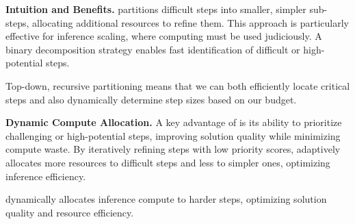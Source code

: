 \textbf{Intuition and Benefits.} \decomp partitions difficult steps into smaller, simpler sub-steps, allocating additional resources to refine them. This approach is particularly effective for inference scaling, where computing must be used judiciously. A binary decomposition strategy enables fast identification of difficult or high-potential steps.

\vspace{-0.2cm}
\begin{tcolorbox}[title=Key Insight: Recursive partitioning, colframe=low,boxsep=0.5mm]
\footnotesize{
    Top-down, recursive partitioning means that we can both efficiently locate critical steps and also dynamically determine step sizes based on our budget.}
\end{tcolorbox}
\vspace{-0.2cm}
\textbf{Dynamic Compute Allocation.}  
A key advantage of \decomp is its ability to prioritize challenging or high-potential steps, improving solution quality while minimizing compute waste. By iteratively refining steps with low priority scores, \decomp adaptively allocates more resources to difficult steps and less to simpler ones, optimizing inference efficiency.
\vspace{-0.2cm}
\begin{tcolorbox}[title=Key Insight: Adaptive compute allocation, colframe=low,boxsep=0.5mm]\footnotesize{
    \decomp dynamically allocates inference compute to harder steps, optimizing solution quality and resource efficiency.}
\end{tcolorbox}






